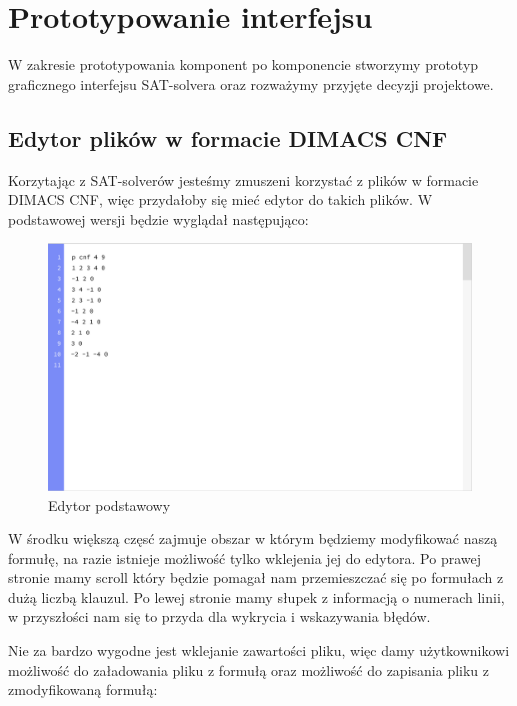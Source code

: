 \documentclass[a4paper,12pt,oneside]{book}
\theoremstyle{definition}
\begin{document}
\section{Prototypowanie interfejsu}

W zakresie prototypowania komponent po komponencie stworzymy prototyp graficznego interfejsu SAT-solvera oraz rozważymy przyjęte decyzji projektowe.

\subsection{Edytor plików w formacie DIMACS CNF}

Korzytając z SAT-solverów jesteśmy zmuszeni korzystać z plików w formacie DIMACS CNF, więc przydałoby się mieć edytor do takich plików. W podstawowej wersji będzie wyglądał następująco:

\newpage

\begin{figure}[ht]
    \centering
    \includegraphics[width=14.30cm]{1}
    \caption{Edytor podstawowy}
    \label{fig:1}
\end{figure}

\noindent W środku większą częsć zajmuje obszar w którym będziemy modyfikować naszą formułę, na razie istnieje możliwość tylko wklejenia jej do edytora. Po prawej stronie mamy scroll który będzie pomagał nam przemieszczać się po formułach z dużą liczbą klauzul. Po lewej stronie mamy słupek z informacją o numerach linii, w przyszłości nam się to przyda dla wykrycia i wskazywania błędów.

Nie za bardzo wygodne jest wklejanie zawartości pliku, więc damy użytkownikowi możliwość do załadowania pliku z formułą oraz możliwość do zapisania pliku z zmodyfikowaną formułą:
\end{document}
